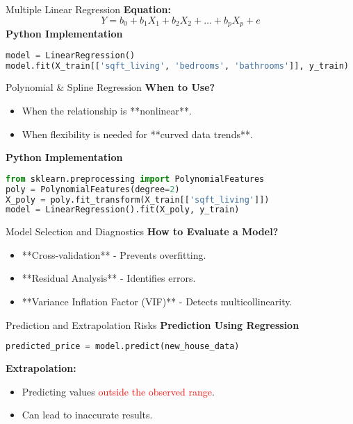\documentclass{beamer}
\begin{document}
\begin{frame}[fragile]{Multiple Linear Regression}
    \textbf{Equation:}
    \[
    Y = b_0 + b_1X_1 + b_2X_2 + \dots + b_pX_p + e
    \]
    \textbf{Python Implementation}
    \begin{lstlisting}[language=Python]
model = LinearRegression()
model.fit(X_train[['sqft_living', 'bedrooms', 'bathrooms']], y_train)
    \end{lstlisting}
\end{frame}

\begin{frame}[fragile]{Polynomial & Spline Regression}
    \textbf{When to Use?}
    \begin{itemize}
        \item When the relationship is **nonlinear**.
        \item When flexibility is needed for **curved data trends**.
    \end{itemize}
    \textbf{Python Implementation}
    \begin{lstlisting}[language=Python]
from sklearn.preprocessing import PolynomialFeatures
poly = PolynomialFeatures(degree=2)
X_poly = poly.fit_transform(X_train[['sqft_living']])
model = LinearRegression().fit(X_poly, y_train)
    \end{lstlisting}
\end{frame}

\begin{frame}{Model Selection and Diagnostics}
    \textbf{How to Evaluate a Model?}
    \begin{itemize}
        \item **Cross-validation** - Prevents overfitting.
        \item **Residual Analysis** - Identifies errors.
        \item **Variance Inflation Factor (VIF)** - Detects multicollinearity.
    \end{itemize}
\end{frame}

\begin{frame}[fragile]{Prediction and Extrapolation Risks}
    \textbf{Prediction Using Regression}
    \begin{lstlisting}[language=Python]
predicted_price = model.predict(new_house_data)
    \end{lstlisting}
    \textbf{Extrapolation:}
    \begin{itemize}
        \item Predicting values \textcolor{red}{outside the observed range}.
        \item Can lead to inaccurate results.
    \end{itemize}
\end{frame}
\end{document}
